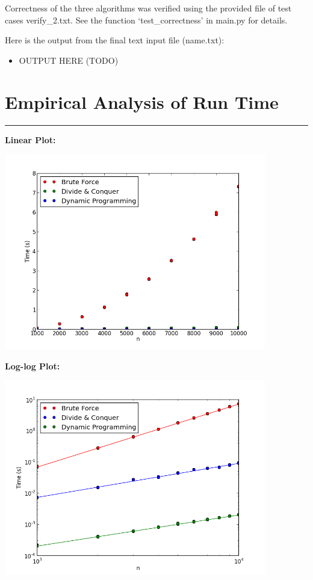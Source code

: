 \documentclass[letterpaper,10pt,titlepage,fleqn]{article}
\begin{document}
Correctness of the three algorithms was verified using the provided file of test cases verify\_2.txt. See the function `test\_correctness' in main.py for details. 

Here is the output from the final text input file (name.txt):

\begin{itemize}
\item OUTPUT HERE (TODO)
\end{itemize}

 \newpage

\section*{Empirical Analysis of Run Time}
\hrule
\textbf{Linear Plot:}
\vskip 0.04in
\begin{center}
\includegraphics[width=4.5in]{linear.png}
\end{center}
\textbf{Log-log Plot:}
\vskip 0.04in
\begin{center}
\includegraphics[width=4.5in]{loglog.png}
\end{center}
\end{document}

